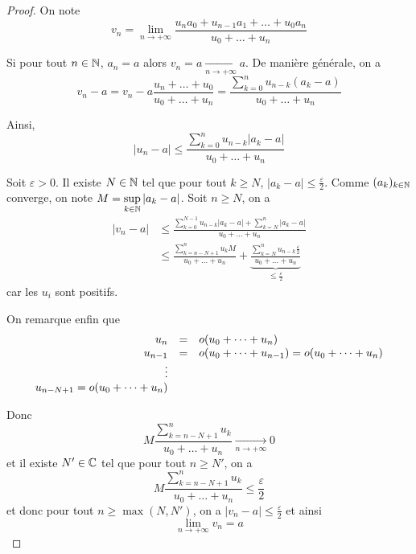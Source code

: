 \begin{proof}
	On note 
	$$v_{n}=\lim\limits_{n\to+\infty}\frac{u_{n}a_{0}+u_{n-1}a_{1}+\dots+u_{0}a_{n}}{u_{0}+\dots+u_{n}}$$

	Si pour tout $n\in\mathbb{N}$, $a_{n}=a$ alors $v_{n}=a\xrightarrow[n\to+\infty]{}a$. De manière générale, on a 
	$$v_{n}-a=v_{n}-a\frac{u_{n}+\dots+u_{0}}{u_{0}+\dots+u_{n}}=\frac{\sum_{k=0}^{n}u_{n-k}(a_{k}-a)}{u_{0}+\dots+u_{n}}$$

	Ainsi,
	$$\vert u_{n}-a\vert\leqslant\frac{\sum_{k=0}^{n}u_{n-k}\vert a_{k}-a\vert}{u_{0}+\dots+u_{n}}$$

	Soit $\varepsilon>0$. Il existe $N\in\mathbb{N}$ tel que pour tout $k\geqslant N$, $\vert a_{k}-a\vert\leqslant\frac{\varepsilon}{2}$. Comme $(a_{k})_{k\in\mathbb{N}}$ converge, on note $M=\sup\limits_{k\in\mathbb{N}}\vert a_{k}-a\vert$. Soit $n\geqslant N$, on a 
	\begin{align*}
		\vert v_{n}-a\vert
		&\leqslant\frac{\sum_{k=0}^{N-1}u_{n-k}\vert a_{k}-a\vert+\sum_{k=N}^{n}\vert a_{k}-a\vert}{u_{0}+\dots+u_{n}}\\
		&\leqslant\frac{\sum_{k=n-N+1}^{n}u_{k}M}{u_{0}+\dots+u_{n}}+\underbrace{\frac{\sum_{k=N}^{n}u_{n-k}\frac{\varepsilon}{2}}{u_{0}+\dots+u_{n}}}_{\leqslant\frac{\varepsilon}{2}}
	\end{align*}
	car les $u_{i}$ sont positifs.

	On remarque enfin que 
	$$
	\begin{array}[]{rcl}
		u_{n} &=& o(u_{0}+\dots+u_{n})\\
		u_{n-1} &=& o(u_{0}+\dots+u_{n-1})=o(u_{0}+\dots+u_{n})\\
		\vdots & &\\
		u_{n-N+1}=o(u_{0}+\dots+u_{n})
	\end{array}
	$$

	Donc 
	$$M\frac{\sum_{k=n-N+1}^{n}u_{k}}{u_{0}+\dots+u_{n}}\xrightarrow[n\to+\infty]{}0$$
	et il existe $N'\in\mathbb{C}$ tel que pour tout $n\geqslant N'$, on a 
	$$M\frac{\sum_{k=n-N+1}^{n}u_{k}}{u_{0}+\dots+u_{n}}\leqslant\frac{\varepsilon}{2}$$
	et donc pour tout $n\geqslant\max(N,N')$, on a $\vert v_{n}-a\vert\leqslant\frac{\varepsilon}{2}$ et ainsi 
	$$\boxed{\lim\limits_{n\to+\infty}v_{n}=a}$$
\end{proof}

